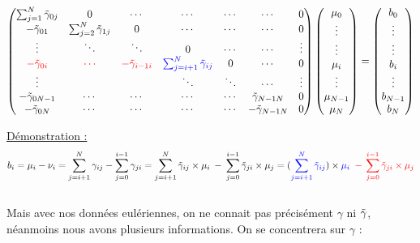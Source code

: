 \documentclass[12pt]{article}
\newcommand{\demo}{\underline{Démonstration :}}
\begin{document}
\begin{adjustwidth}{-2cm}{-2cm}
\[
\begin{pmatrix}
\sum^N_{j=1} \Tilde{\gamma}_{0j} & 0 & \cdots & \cdots & \cdots & \cdots & 0\\
- \Tilde{\gamma}_{01} & \sum^N_{j=2} \Tilde{\gamma}_{1j} & 0 & \cdots & \cdots & \cdots & 0\\
\vdots & \ddots & \ddots   & 0 &\cdots& \cdots & \vdots  \\
\textcolor{red}{- \Tilde{\gamma}_{0i}} & \textcolor{red}{\cdots} & \textcolor{red}{- \Tilde{\gamma}_{i-1i}} & \textcolor{blue}{\sum^N_{j=i+1} \Tilde{\gamma}_{ij}} & 0 & \cdots & 0 \\
\vdots &  & &  \ddots & \ddots & \cdots  &\vdots \\
- \Tilde{\gamma}_{0N-1} & \cdots & \cdots & \cdots & \cdots & \Tilde{\gamma}_{N-1N} & 0\\
- \Tilde{\gamma}_{0N} & \cdots & \cdots & \cdots  & \cdots & - \Tilde{\gamma}_{N-1N} & 0\\
\end{pmatrix}
\begin{pmatrix}
\mu_0\\
\vdots\\
\vdots\\
\mu_i\\
\vdots\\
\mu_{N-1}\\
\mu_N\\
\end{pmatrix}
=
\begin{pmatrix}
b_0\\
\vdots\\
\vdots\\
b_i\\
\vdots\\
b_{N-1}\\
b_N\\
\end{pmatrix}
\]
\end{adjustwidth}
\demo \[b_i = \mu_i - \nu_i =  \sum^N_{j=i+1} \gamma_{ij} - \sum^{i-1}_{j=0} \gamma_{ji} = \sum^N_{j=i+1} \Tilde{\gamma}_{ij}\times\mu_i\: - \:\sum^{i-1}_{j=0} \Tilde{\gamma}_{ji}\times\mu_j =  (\textcolor{blue}{\sum^N_{j=i+1} \Tilde{\gamma}_{ij}})\times\textcolor{blue}{\mu_i} \: \; \textcolor{red}{- \: \sum^{i-1}_{j=0} \Tilde{\gamma}_{ji}\times\mu_j} \]
\\
Mais avec nos données eulériennes, on ne connait pas précisément $\gamma$ ni $\Tilde{\gamma}$, néanmoins nous avons plusieurs informations. On se concentrera sur $\gamma$ :\\
\end{document}
